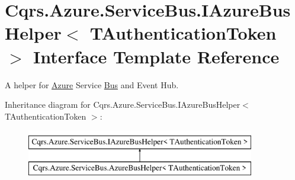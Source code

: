 \hypertarget{interfaceCqrs_1_1Azure_1_1ServiceBus_1_1IAzureBusHelper}{}\section{Cqrs.\+Azure.\+Service\+Bus.\+I\+Azure\+Bus\+Helper$<$ T\+Authentication\+Token $>$ Interface Template Reference}
\label{interfaceCqrs_1_1Azure_1_1ServiceBus_1_1IAzureBusHelper}


A helper for \hyperlink{namespaceCqrs_1_1Azure}{Azure} Service \hyperlink{namespaceCqrs_1_1Bus}{Bus} and Event Hub.  


Inheritance diagram for Cqrs.\+Azure.\+Service\+Bus.\+I\+Azure\+Bus\+Helper$<$ T\+Authentication\+Token $>$\+:\begin{figure}[H]
\begin{center}
\leavevmode
\includegraphics[height=2.000000cm]{interfaceCqrs_1_1Azure_1_1ServiceBus_1_1IAzureBusHelper}
\end{center}
\end{figure}

